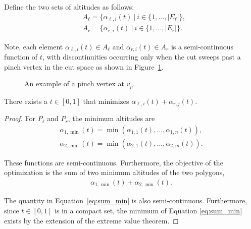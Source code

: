 \documentclass[../main.tex]{subfiles}
\begin{document}
Define the two sets of altitudes as follows:
\begin{equation}
\begin{aligned}
\label{eq:set_of_altitudes}
&A_{\ell}=\{\alpha_{\ell,i}(t)\ |\ i\in\{1,\ldots,|E_{\ell}|\},\\
&A_{r}=\{\alpha_{r,i}(t)\ |\ i\in\{1,\ldots,|E_r|\}.
\end{aligned}
\end{equation}


Note, each element $\alpha_{\ell,i}(t)\in A_{\ell}$ and $\alpha_{r,i}(t)\in A_r$ is a semi-continuous function of $t$, with discontinuities occurring only when the cut sweeps past a pinch vertex in the cut space as shown in Figure~\ref{fig:pinch_vertex}.

\begin{figure}
	\centering
	
	\caption{An example of a pinch vertex at $v_p$.}
	\label{fig:pinch_vertex}
\end{figure}

\begin{lemma}
There exists a $t\in[0,1]$ that minimizes $\alpha_{\ell,i}(t)+\alpha_{r,j}(t)$.
\end{lemma}
\begin{proof}
For $P_{\ell}$ and $P_r$, the minimum altitudes are
\begin{equation}
\begin{aligned}
\alpha_{1,\min}(t)=\min(\alpha_{1,1}(t),\ldots,\alpha_{1,n}(t)),\\
\alpha_{2,\min}(t)=\min(\alpha_{2,1}(t),\ldots,\alpha_{2,m}(t)).
\end{aligned}
\end{equation}


These functions are semi-continuous. Furthermore, the objective of the optimization is the sum of two minimum altitudes of the two polygons,
\begin{equation}
\begin{aligned}
\label{eq:sum_min}
\alpha_{1,\min}(t)+\alpha_{2,\min}(t).
\end{aligned}
\end{equation}

The quantity in Equation~\ref{eq:sum_min} is also semi-continuous. Furthermore, since $t\in[0,1]$ is in a compact set, the minimum of Equation \ref{eq:sum_min} exists by the extension of the extreme value theorem.
\end{proof}
\end{document}
